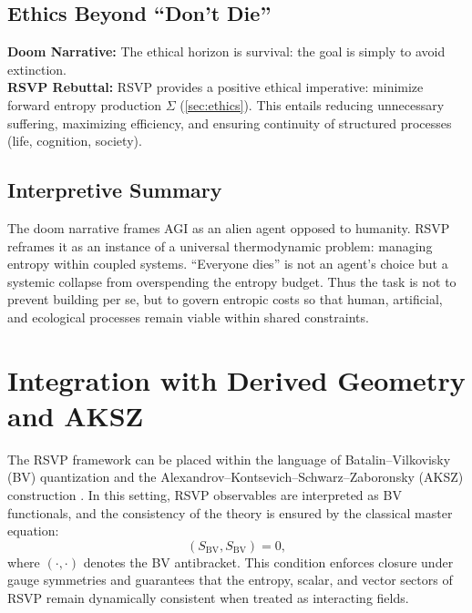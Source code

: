 \documentclass[12pt]{article}
\begin{document}
\subsection{Ethics Beyond ``Don’t Die''}
\textbf{Doom Narrative:} The ethical horizon is survival: the goal is simply to avoid extinction.\\
\textbf{RSVP Rebuttal:} RSVP provides a positive ethical imperative: minimize forward entropy production $\Sigma$ (\autoref{sec:ethics}). This entails reducing unnecessary suffering, maximizing efficiency, and ensuring continuity of structured processes (life, cognition, society).

\subsection{Interpretive Summary}
The doom narrative frames AGI as an alien agent opposed to humanity. RSVP reframes it as an instance of a universal thermodynamic problem: managing entropy within coupled systems. ``Everyone dies'' is not an agent’s choice but a systemic collapse from overspending the entropy budget. Thus the task is not to prevent building per se, but to govern entropic costs so that human, artificial, and ecological processes remain viable within shared constraints.

\section{Integration with Derived Geometry and AKSZ}

The RSVP framework can be placed within the language of Batalin–Vilkovisky (BV) quantization \cite{BatalinVilkovisky1981} and the Alexandrov–Kontsevich–Schwarz–Zaboronsky (AKSZ) construction \cite{Alexandrov:1995kv}. In this setting, RSVP observables are interpreted as BV functionals, and the consistency of the theory is ensured by the classical master equation:
\begin{equation}
(S_{\mathrm{BV}}, S_{\mathrm{BV}}) = 0 ,
\end{equation}
where $(\cdot,\cdot)$ denotes the BV antibracket. This condition enforces closure under gauge symmetries and guarantees that the entropy, scalar, and vector sectors of RSVP remain dynamically consistent when treated as interacting fields.
\end{document}

